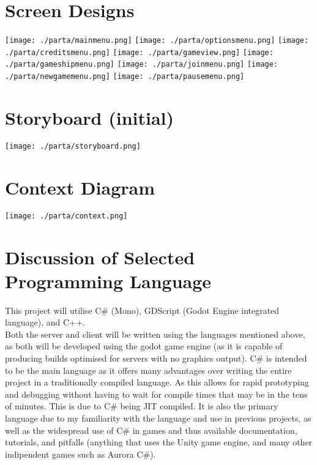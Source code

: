 \documentclass[12pt, DIV=calc]{scrartcl}
\begin{document}
\section{Screen Designs}
\texttt{[image: ./parta/mainmenu.png]}
\texttt{[image: ./parta/optionsmenu.png]}
\texttt{[image: ./parta/creditsmenu.png]}
\texttt{[image: ./parta/gameview.png]}
\texttt{[image: ./parta/gameshipmenu.png]}
\texttt{[image: ./parta/joinmenu.png]}
\texttt{[image: ./parta/newgamemenu.png]}
\texttt{[image: ./parta/pausemenu.png]}


\section{Storyboard (initial)}
\texttt{[image: ./parta/storyboard.png]}



\section{Context Diagram}
\texttt{[image: ./parta/context.png]}


\section{Discussion of Selected Programming Language}
This project will utilise C\# (Mono), GDScript (Godot Engine integrated language), and C++. \\

\noindent Both the server and client will be written using the languages mentioned above, as both will be developed using the godot game engine (as it is capable of producing builds optimised for servers with no graphics output). C\# is intended to be the main language as it offers many advantages over writing the entire project in a traditionally compiled language. As this allows for rapid prototyping and debugging without having to wait for compile times that may be in the tens of minutes. This is due to C\# being JIT compiled. It is also the primary language due to my familiarity with the language and use in previous projects, as well as the widespread use of C\# in games and thus available documentation, tutorials, and pitfalls (anything that uses the Unity game engine, and many other indipendent games such as Aurora C\#). \\
\end{document}
